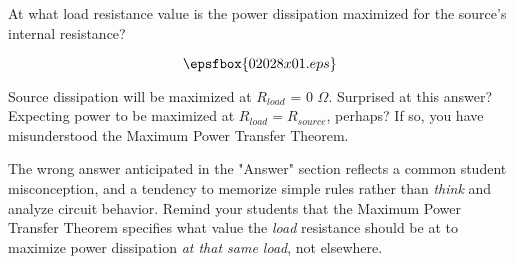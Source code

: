

At what load resistance value is the power dissipation maximized for the source's internal resistance?

$$\epsfbox{02028x01.eps}$$







Source dissipation will be maximized at $R_{load}$ = 0 $\Omega$.  Surprised at this answer?  Expecting power to be maximized at $R_{load} = R_{source}$, perhaps?  If so, you have misunderstood the Maximum Power Transfer Theorem.







The wrong answer anticipated in the "Answer" section reflects a common student misconception, and a tendency to memorize simple rules rather than {\it think} and analyze circuit behavior.  Remind your students that the Maximum Power Transfer Theorem specifies what value the {\it load} resistance should be at to maximize power dissipation {\it at that same load}, not elsewhere.




